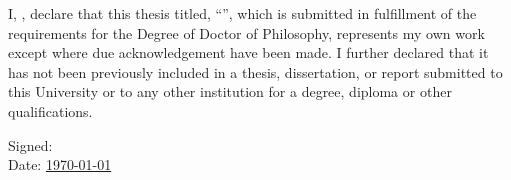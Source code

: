 \begin{declaration}
\setcounter{page}{1}
\addchaptertocentry{\authorshipname} %

\vspace{0.6cm}
I, \authorname, declare that this thesis titled, \enquote{\ttitle}, which is submitted in fulfillment of the requirements for the Degree of Doctor of Philosophy, represents my own work except where due acknowledgement have been made. I further declared that it has not been previously included in a thesis, dissertation, or report submitted to this University or to any other institution for a degree, diploma or other qualifications.


\vspace{2cm} 
\begin{flushright}
\hfill Signed: \underline{\hspace{5cm}}\\[2em] %
\hfill Date: \underline{\hspace{1.5cm} \usdate\today \hspace{1.5cm}}\\ %
\end{flushright}

\end{declaration}


